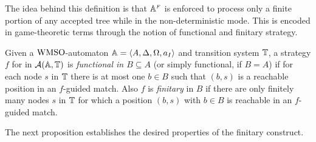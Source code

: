 The idea behind this definition is that $\mathbb{A}^{{\scriptscriptstyle F}}$ is enforced to process only a finite portion of any accepted tree while in the non-deterministic mode. This is encoded in game-theoretic terms through the notion of functional and finitary strategy. 

\begin{definition}\label{def:StratfunctionalFinitary}
Given a $\mathrm{WMSO}$-automaton $\mathbb{A} = \langle{A,\Delta,\Omega,a_I}\rangle$ and transition system $\mathbb{T}$, a strategy $f$ for \eloise in $\mathcal{A}(\mathbb{A},\mathbb{T})$ is \emph{functional in $B \subseteq A$} (or simply functional, if $B=A$) if for each node $s$ in $\mathbb{T}$ there is at most one $b \in B$ such that $(b,s)$ is a reachable position in an $f$-guided match. Also $f$ is \emph{finitary} in $B$ if there are only finitely many nodes $s$ in $\mathbb{T}$ for which a position $(b,s)$ with $b \in B$ is reachable in an $f$-guided match.
\end{definition}



The next proposition establishes the desired properties of the finitary
construct.

